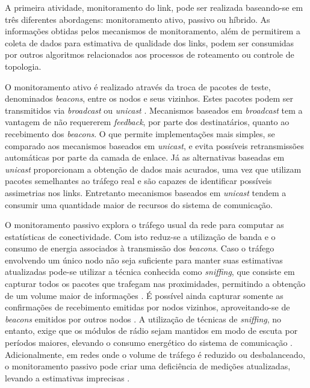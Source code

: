\documentclass[
	12pt,				%
	openright,			%
	oneside,
	a4paper,			%
	english,			%
	french,				%
	spanish,			%
	brazil				%
	]{abntex2}
\begin{document}
A primeira atividade, monitoramento do link, pode ser realizada baseando-se em três diferentes abordagens: monitoramento ativo, passivo ou híbrido. As informações obtidas pelos mecanismos de monitoramento, além de permitirem a coleta de dados para estimativa de qualidade dos links, podem ser consumidas por outros algoritmos relacionados aos processos de roteamento ou controle de topologia.

O monitoramento ativo é realizado através da troca de pacotes de teste, denominados \textit{beacons}, entre os nodos e seus vizinhos. Estes pacotes podem ser transmitidos via \textit{broadcast} \cite{DeCouto2005} ou \textit{unicast} \cite{Kim2006}. Mecanismos baseados em \textit{broadcast} tem a vantagem de não requererem \textit{feedback}, por parte dos destinatários, quanto ao recebimento dos \textit{beacons}. O que permite implementações mais simples, se comparado aos mecanismos baseados em \textit{unicast}, e evita possíveis retransmissões automáticas por parte da camada de enlace. Já as alternativas baseadas em \textit{unicast} proporcionam a obtenção de dados mais acurados, uma vez que utilizam pacotes semelhantes ao tráfego real \cite{Sang2010} e são capazes de identificar possíveis assimetrias nos links. Entretanto mecanismos baseados em \textit{unicast} tendem a consumir uma quantidade maior de recursos do sistema de comunicação.

O monitoramento passivo explora o tráfego usual da rede para computar as estatísticas de conectividade. Com isto reduz-se a utilização de banda e o consumo de energia associados à transmissão dos \textit{beacons}. Caso o tráfego envolvendo um único nodo não seja suficiente para manter suas estimativas atualizadas pode-se utilizar a técnica conhecida como \textit{sniffing}, que consiste em capturar todos os pacotes que trafegam nas proximidades, permitindo a obtenção de um volume maior de informações \cite{LaI2003,Woo2003}. É possível ainda capturar somente as confirmações de recebimento emitidas por nodos vizinhos, aproveitando-se de \textit{beacons} emitidos por outros nodos \cite{PengJiang2006,YanjunLi2005}. A utilização de técnicas de \textit{sniffing}, no entanto, exige que os módulos de rádio sejam mantidos em modo de escuta por períodos maiores, elevando o consumo energético do sistema de comunicação \cite{LaI2003}. Adicionalmente, em redes onde o volume de tráfego é reduzido ou desbalanceado, o monitoramento passivo pode criar uma deficiência de medições atualizadas, levando a estimativas imprecisas \cite{Baccour2012}.
\end{document}
